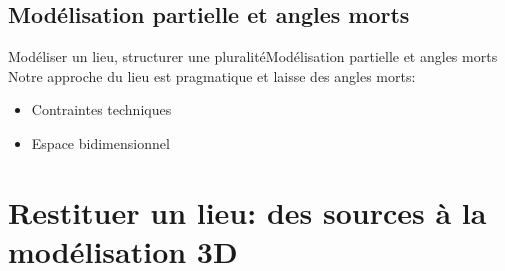 \documentclass[8pt]{beamer}
\begin{document}
\subsection[Modélisation partielle]{Modélisation partielle et angles morts}
\begin{frame}{Modéliser un lieu, structurer une pluralité}{Modélisation partielle et angles morts}
	Notre approche du lieu est pragmatique et laisse des angles morts:
	\begin{itemize}
		\item Contraintes techniques
		\item Espace bidimensionnel
	\end{itemize}
\end{frame}

\section{Restituer un lieu: des sources à la modélisation 3D}
\end{document}
